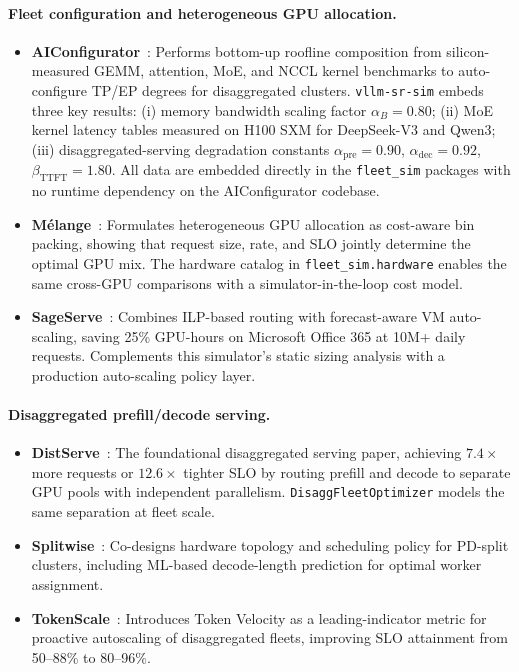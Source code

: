 \documentclass[11pt,a4paper]{article}
\begin{document}
\paragraph{Fleet configuration and heterogeneous GPU allocation.}
\begin{itemize}[nosep]
  \item \textbf{AIConfigurator}~\citep{xu2025aiconfigurator}:
    Performs bottom-up roofline composition from silicon-measured GEMM,
    attention, MoE, and NCCL kernel benchmarks to auto-configure TP/EP
    degrees for disaggregated clusters.
    \texttt{vllm-sr-sim} embeds three key results:
    (i) memory bandwidth scaling factor $\alpha_{B} = 0.80$;
    (ii) MoE kernel latency tables measured on H100 SXM for DeepSeek-V3
    and Qwen3; (iii) disaggregated-serving degradation constants
    $\alpha_{\text{pre}} = 0.90$, $\alpha_{\text{dec}} = 0.92$,
    $\beta_{\text{TTFT}} = 1.80$.
    All data are embedded directly in the \texttt{fleet\_sim} packages
    with no runtime dependency on the AIConfigurator codebase.
  \item \textbf{M\'{e}lange}~\citep{griggs2024melange}:
    Formulates heterogeneous GPU allocation as cost-aware bin packing,
    showing that request size, rate, and SLO jointly determine the
    optimal GPU mix.  The hardware catalog in
    \texttt{fleet\_sim.hardware} enables the same cross-GPU comparisons
    with a simulator-in-the-loop cost model.
  \item \textbf{SageServe}~\citep{jia2025sageserve}:
    Combines ILP-based routing with forecast-aware VM auto-scaling, saving
    25\% GPU-hours on Microsoft Office 365 at 10M+ daily requests.
    Complements this simulator's static sizing analysis with a production
    auto-scaling policy layer.
\end{itemize}

\paragraph{Disaggregated prefill/decode serving.}
\begin{itemize}[nosep]
  \item \textbf{DistServe}~\citep{zhong2024distserve}:
    The foundational disaggregated serving paper, achieving
    $7.4\times$ more requests or $12.6\times$ tighter SLO by routing
    prefill and decode to separate GPU pools with independent
    parallelism.  \texttt{DisaggFleetOptimizer} models the same
    separation at fleet scale.
  \item \textbf{Splitwise}~\citep{patel2024splitwise}:
    Co-designs hardware topology and scheduling policy for PD-split
    clusters, including ML-based decode-length prediction for optimal
    worker assignment.
  \item \textbf{TokenScale}~\citep{tokenscale2024}:
    Introduces Token Velocity as a leading-indicator metric for proactive
    autoscaling of disaggregated fleets, improving SLO attainment from
    50--88\% to 80--96\%.
\end{itemize}
\end{document}
